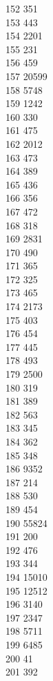 { 152	351 \\
 153	443 \\
 154	2201 \\
 155	231 \\
 156	459 \\
 157	20599 \\
 158	5748 \\
 159	1242 \\
 160	330 \\
 161	475 \\
 162	2012 \\
 163	473 \\
 164	389 \\
 165	436 \\
 166	356 \\
 167	472 \\
 168	318 \\
 169	2831 \\
 170	490 \\
 171	365 \\
 172	325 \\
 173	465 \\
 174	2173 \\
 175	403 \\
 176	454 \\
 177	445 \\
 178	493 \\
 179	2500 \\
 180	319 \\
 181	389 \\
 182	563 \\
 183	345 \\
 184	362 \\
 185	348 \\
 186	9352 \\
 187	214 \\
 188	530 \\
 189	454 \\
 190	55824 \\
 191	200 \\
 192	476 \\
 193	344 \\
 194	15010 \\
 195	12512 \\
 196	3140 \\
 197	2347 \\
 198	5711 \\
 199	6485 \\
 200	41 \\
 201	392 \\
}
